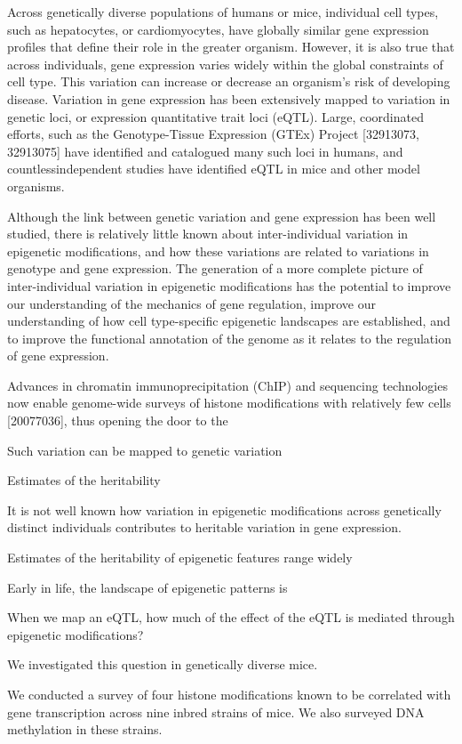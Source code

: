 \documentclass[10pt,letterpaper]{article}
\begin{document}
Across genetically diverse populations of humans or mice, individual
cell types, such as hepatocytes, or cardiomyocytes, have globally
similar gene expression profiles that define their role in the greater
organism. However, it is also true that across individuals, gene
expression varies widely within the global constraints of cell type.
This variation can increase or decrease an organism's risk of developing
disease. Variation in gene expression has been extensively mapped to
variation in genetic loci, or expression quantitative trait loci (eQTL).
Large, coordinated efforts, such as the Genotype-Tissue Expression
(GTEx) Project {[}32913073, 32913075{]} have identified and catalogued
many such loci in humans, and countlessindependent studies have
identified eQTL in mice and other model organisms.

Although the link between genetic variation and gene expression has been
well studied, there is relatively little known about inter-individual
variation in epigenetic modifications, and how these variations are
related to variations in genotype and gene expression. The generation of
a more complete picture of inter-individual variation in epigenetic
modifications has the potential to improve our understanding of the
mechanics of gene regulation, improve our understanding of how cell
type-specific epigenetic landscapes are established, and to improve the
functional annotation of the genome as it relates to the regulation of
gene expression.

Advances in chromatin immunoprecipitation (ChIP) and sequencing
technologies now enable genome-wide surveys of histone modifications
with relatively few cells {[}20077036{]}, thus opening the door to the

Such variation can be mapped to genetic variation

Estimates of the heritability

It is not well known how variation in epigenetic modifications across
genetically distinct individuals contributes to heritable variation in
gene expression.

Estimates of the heritability of epigenetic features range widely

Early in life, the landscape of epigenetic patterns is

When we map an eQTL, how much of the effect of the eQTL is mediated
through epigenetic modifications?

We investigated this question in genetically diverse mice.

We conducted a survey of four histone modifications known to be
correlated with gene transcription across nine inbred strains of mice.
We also surveyed DNA methylation in these strains.
\end{document}
